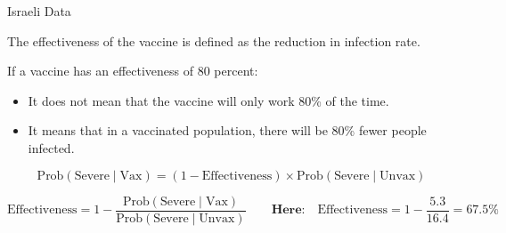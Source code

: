 \documentclass[8pt,aspectratio=169]{beamer}
\newcommand{\bs}{\vspace{\baselineskip}}
\newcommand{\Vax}{\text{Vax}}
\newcommand{\Unvax}{\text{Unvax}}
\newcommand{\Severe}{\text{Severe}}
\newcommand{\Effectiveness}{\text{Effectiveness}}
\newcommand{\Prob}{\text{Prob}}
\begin{document}
\begin{frame}{Israeli Data}


  


  \bs

  The effectiveness of the vaccine is defined as the reduction in infection
  rate\footnotemark{}.


  \bs

  If a vaccine has an effectiveness of 80 percent:

  \begin{itemize}

    \item It does not mean that the vaccine will only work 80\% of the time.

    \item It means that in a vaccinated population, there will be 80\% fewer
      people infected.

  \end{itemize}

  \[
    \Prob(\Severe \mid \Vax)
    = (1 - \Effectiveness) \times \Prob(\Severe \mid \Unvax)
  \]

  \[
    \Effectiveness
    = 1 - \frac{\Prob(\Severe \mid \Vax)}{\Prob(\Severe \mid \Unvax)}
    \qquad \textbf{Here:} \quad
    \Effectiveness = 1 - \frac{5.3}{16.4} = 67.5\%
  \]

\end{frame}

\end{document}
